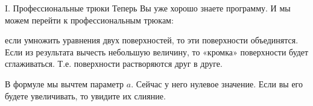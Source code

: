 \begin{surferPage}{I. Профессиональные трюки}
Теперь Вы уже хорошо знаете программу. И мы можем перейти к профессиональным трюкам:

если умножить уравнения двух поверхностей, то эти поверхности объединятся. Если из результата вычесть небольшую величину, то «кромка» поверхности будет сглаживаться. Т.е. поверхности растворяются друг в друге.

В формуле мы вычтем параметр $a$. Сейчас у него нулевое значение. Если вы его будете увеличивать, то увидите их слияние.
\end{surferPage}
